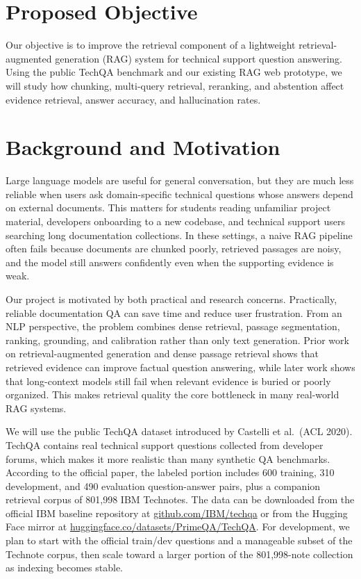 \documentclass[paper=a4, fontsize=11pt]{scrartcl}
\author{
    \textbf{Yifan Tao and Letong Yi} \\
    \texttt{tao.yif@northeastern.edu, yi.le@northeastern.edu}
}
\begin{document}
\maketitle

\section{Proposed Objective}

Our objective is to improve the retrieval component of a lightweight retrieval-augmented generation (RAG) system for technical support question answering. Using the public TechQA benchmark and our existing RAG web prototype, we will study how chunking, multi-query retrieval, reranking, and abstention affect evidence retrieval, answer accuracy, and hallucination rates.

\section{Background and Motivation}

Large language models are useful for general conversation, but they are much less reliable when users ask domain-specific technical questions whose answers depend on external documents. This matters for students reading unfamiliar project material, developers onboarding to a new codebase, and technical support users searching long documentation collections. In these settings, a naive RAG pipeline often fails because documents are chunked poorly, retrieved passages are noisy, and the model still answers confidently even when the supporting evidence is weak.

Our project is motivated by both practical and research concerns. Practically, reliable documentation QA can save time and reduce user frustration. From an NLP perspective, the problem combines dense retrieval, passage segmentation, ranking, grounding, and calibration rather than only text generation. Prior work on retrieval-augmented generation and dense passage retrieval shows that retrieved evidence can improve factual question answering, while later work shows that long-context models still fail when relevant evidence is buried or poorly organized. This makes retrieval quality the core bottleneck in many real-world RAG systems.

We will use the public TechQA dataset introduced by Castelli et al.\ (ACL 2020). TechQA contains real technical support questions collected from developer forums, which makes it more realistic than many synthetic QA benchmarks. According to the official paper, the labeled portion includes 600 training, 310 development, and 490 evaluation question-answer pairs, plus a companion retrieval corpus of 801,998 IBM Technotes. The data can be downloaded from the official IBM baseline repository at \href{https://github.com/IBM/techqa}{github.com/IBM/techqa} or from the Hugging Face mirror at \href{https://huggingface.co/datasets/PrimeQA/TechQA}{huggingface.co/datasets/PrimeQA/TechQA}. For development, we plan to start with the official train/dev questions and a manageable subset of the Technote corpus, then scale toward a larger portion of the 801,998-note collection as indexing becomes stable.
\end{document}
